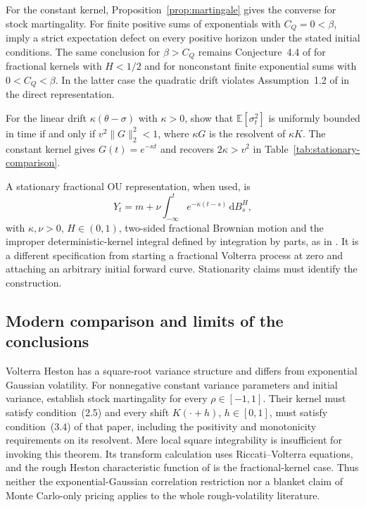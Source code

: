 \documentclass[11pt,a4paper]{article}
\theoremstyle{definition}
\theoremstyle{remark}
\newcommand{\E}{\mathbb{E}}
\newcommand{\dd}{\,\mathrm{d}}
\begin{document}
For the constant kernel, Proposition~\ref{prop:martingale} gives the converse for stock martingality. For finite positive sums of exponentials with $C_Q=0<\beta$, \citet[Corollary~2.6(ii)]{GuyonJeanninJourdain2026} imply a strict expectation defect on every positive horizon under the stated initial conditions. The same conclusion for $\beta>C_Q$ remains Conjecture~4.4 of \citet{SeppRakhmonovRoughLogSV2026} for fractional kernels with $H<1/2$ and for nonconstant finite exponential sums with $0<C_Q<\beta$. In the latter case the quadratic drift violates Assumption~1.2 of \citet{GuyonJeanninJourdain2026} in the direct representation.

For the linear drift $\kappa(\theta-\sigma)$ with $\kappa>0$, \citet[Proposition~3.4]{SeppRakhmonovRoughLogSV2026} show that $\E[\sigma_t^2]$ is uniformly bounded in time if and only if $v^2\|G\|_2^2<1$, where $\kappa G$ is the resolvent of $\kappa K$. The constant kernel gives $G(t)=e^{-\kappa t}$ and recovers $2\kappa>v^2$ in Table~\ref{tab:stationary-comparison}.

A stationary fractional OU representation, when used, is
\[
 Y_t=m+\nu\int_{-\infty}^t e^{-\kappa(t-s)}\dd B_s^H,
\]
with \(\kappa,\nu>0\), \(H\in(0,1)\), two-sided fractional Brownian motion and the improper deterministic-kernel integral defined by integration by parts, as in \citet[Section~2]{CheriditoKawaguchiMaejima2003}. It is a different specification from starting a fractional Volterra process at zero and attaching an arbitrary initial forward curve. Stationarity claims must identify the construction.

\subsection{Modern comparison and limits of the conclusions}

Volterra Heston has a square-root variance structure and differs from exponential Gaussian volatility. For nonnegative constant variance parameters and initial variance, \citet[Theorem~7.1(iii) and Lemma~7.3]{AbiJaberLarssonPulido2019} establish stock martingality for every \(\rho\in[-1,1]\). Their kernel must satisfy condition~(2.5) and every shift \(K(\cdot+h)\), \(h\in[0,1]\), must satisfy condition~(3.4) of that paper, including the positivity and monotonicity requirements on its resolvent. Mere local square integrability is insufficient for invoking this theorem. Its transform calculation uses Riccati--Volterra equations, and the rough Heston characteristic function of \citet{ElEuchRosenbaum2019} is the fractional-kernel case. Thus neither the exponential-Gaussian correlation restriction nor a blanket claim of Monte Carlo-only pricing applies to the whole rough-volatility literature.
\end{document}
